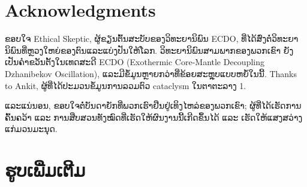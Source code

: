 \documentclass[10pt,twocolumn,letterpaper]{article}
\begin{document}
\section{Acknowledgments}

ຂອບໃຈ Ethical Skeptic, ຜູ້ຂຽນຕົ້ນສະບັບຂອງວິທະຍານິພົນ ECDO, ທີ່ໄດ້ສົ່ງຕໍ່ວິທະຍານິພົນທີ່ຫຼວງໃຫຍ່ຂອງຕົນແລະແບ່ງປັນໃຫ້ໂລກ. ວິທະຍານິພົນສາມພາກຂອງພວກເຂົາ \cite{1} ຍັງເປັນຄຳຂວັນຕັ້ງໃນເທດສະດີ ECDO (Exothermic Core-Mantle Decoupling Dzhanibekov Oscillation), ແລະມີຂໍ້ມູນຫຼາຍກວ່າທີ່ຂ້ອຍສະຫຼຸບແບບຫຍໍ້ໃນນີ້.
Thanks to Ankit, ຜູ້ທີ່ໄດ້ປະມວນຂໍ້ມູນການລວມຕົວ cataclysm ໃນຕາຕະລາງ 1.

ແລະແນ່ນອນ, ຂອບໃຈຕໍ່ບັນດາຍັກທີ່ພວກເຮົາຢືນຢູ່ເທິງໄຫລ່ຂອງພວກເຂົາ; ຜູ້ທີ່ໄດ້ເຮັດການຄົ້ນຄວ້າ ແລະ ການສືບສວນທັງໝົດທີ່ເຮັດໃຫ້ຜົນງານນີ້ເກີດຂຶ້ນໄດ້ ແລະ ເຮັດໃຫ້ແສງສວ່າງແກ່ມວນມະນຸດ.

\clearpage
\twocolumn

\section{ຮູບເພີ່ມເຕີມ}
\end{document}
